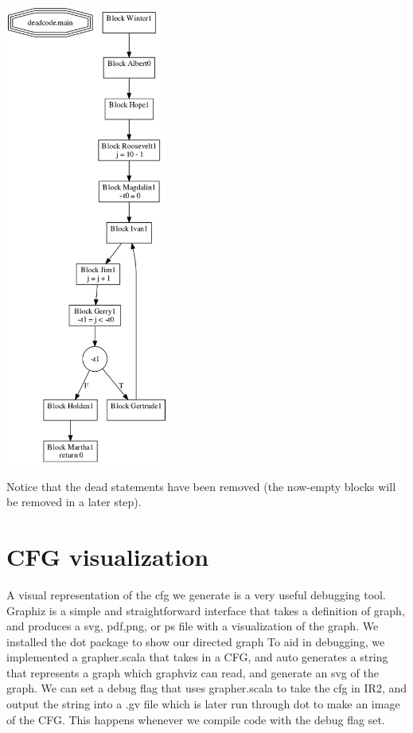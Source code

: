 \documentclass[11pt]{article}
\begin{document}
  \includegraphics[width=0.4\textwidth]{./after_deadcode_example.png}

  Notice that the dead statements have been removed (the now-empty blocks will be removed in a later step).
\section{CFG visualization}
\label{sec-4}

    A visual representation of the cfg we generate is a very useful debugging tool. 
    Graphiz is a simple and straightforward interface that takes a definition of graph, and
    produces a svg, pdf,png, or ps file with a visualization of the graph.
    We installed the dot package to show our directed graph
    To aid in debugging, we implemented a grapher.scala that takes in a CFG,
    and auto generates a string that represents a graph which graphviz can read, and generate an svg of the graph.
    We can set a debug flag that uses grapher.scala to take the cfg in IR2, and output the string into a .gv file which is later run through dot to make an
    image of the CFG.
    This happens whenever we compile code with the debug flag set.
\end{document}
